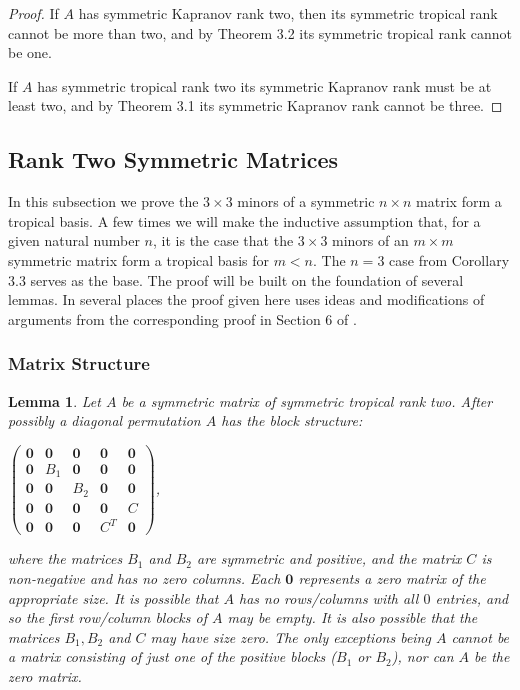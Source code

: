 \documentclass{article}
\begin{document}
\begin{proof}
  If $A$ has symmetric Kapranov rank two, then its symmetric tropical rank cannot be more than two, and by Theorem 3.2 its symmetric tropical rank cannot be one.
  
  If $A$ has symmetric tropical rank two its symmetric Kapranov rank must be at least two, and by Theorem 3.1 its symmetric Kapranov rank cannot be three.
\end{proof}

\subsection{Rank Two Symmetric Matrices}

In this subsection we prove the $3 \times 3$ minors of a symmetric $n \times n$ matrix form a tropical basis. A few times we will make the inductive assumption that, for a given natural number $n$, it is the case that the $3 \times 3$ minors of an $m \times m$ symmetric matrix form a tropical basis for $m < n$. The $n = 3$ case from Corollary 3.3 serves as the base. The proof will be built on the foundation of several lemmas. In several places the proof given here uses ideas and modifications of arguments from the corresponding proof in Section 6 of \cite{dss}.

\subsubsection{Matrix Structure}

\newtheorem{lem}{Lemma}
\begin{lem}
  Let $A$ be a symmetric matrix of symmetric tropical rank two. After possibly a diagonal permutation $A$ has the block structure:
  \begin{center}
    $\left(\begin{array}{ccccc} \textbf{0} & \textbf{0} & \textbf{0} & \textbf{0} & \textbf{0} \\ \textbf{0} & B_{1} & \textbf{0} & \textbf{0} & \textbf{0} \\ \textbf{0} & \textbf{0} & B_{2} & \textbf{0} & \textbf{0} \\ \textbf{0} & \textbf{0} & \textbf{0} & \textbf{0} & C \\ \textbf{0} & \textbf{0} & \textbf{0} & C^{T} & \textbf{0} \end{array}\right)$,
  \end{center}
  where the matrices $B_{1}$ and $B_{2}$ are symmetric and positive, and the matrix $C$ is non-negative and has no zero columns. Each $\textbf{0}$ represents a zero matrix of the appropriate size.  It is possible that $A$ has no rows/columns with all $0$ entries, and so the first row/column blocks of $A$ may be empty. It is also possible that the matrices $B_{1}, B_{2}$ and $C$ may have size zero. The only exceptions being $A$ cannot be a matrix consisting of just one of the positive blocks ($B_{1}$ or $B_{2}$), nor can $A$ be the zero matrix. 
\end{lem}
\end{document}
